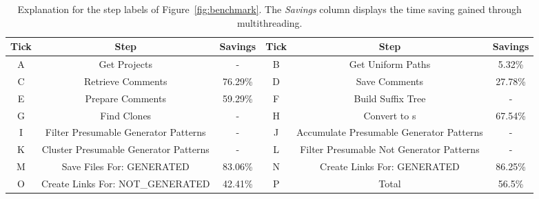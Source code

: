 \setlength{\extrarowheight}{.0em}
\begin{table}
	\caption[Explanation for the step labels of Figure~\ref{fig:benchmark}.]{Explanation for the step labels of Figure~\ref{fig:benchmark}. The \textit{Savings} column displays the time saving gained through multithreading.}
	\label{table:tickLabels}
		\begin{tabularx}{\textwidth}{c|C|c||c|C|c}
			\textbf{Tick} & \textbf{Step} & \textbf{Savings} & \textbf{Tick} & \textbf{Step} & \textbf{Savings}\\
			\hline
			A & Get Projects & - & B & Get Uniform Paths & 5.32\% \\
			C & Retrieve Comments & 76.29\% & D & Save Comments & 27.78\% \\
			E & Prepare Comments & 59.29\% &F& Build Suffix Tree & - \\
			G& Find Clones & - & H & Convert to s & 67.54\%\\
			I&Filter Presumable Generator Patterns & - &J&Accumulate Presumable Generator Patterns & -\\
			K&Cluster Presumable Generator Patterns & - &L&Filter Presumable Not Generator Patterns & -\\
			M& Save Files For: GENERATED& 83.06\% &N&Create Links For: GENERATED & 86.25\%\\
			O& Create Links For: NOT\_GENERATED& 42.41\% & P & Total & 56.5\%
		\end{tabularx}
\end{table}
\setlength{\extrarowheight}{0em}